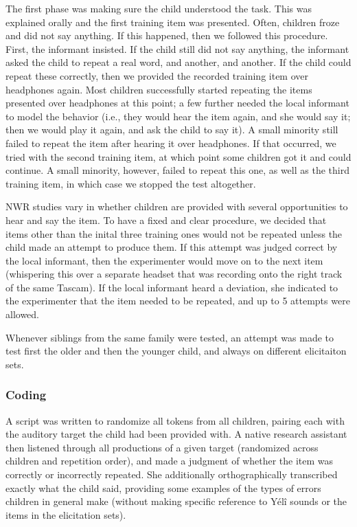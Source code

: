 \documentclass[english,,man,floatsintext]{apa6}
\begin{document}
The first phase was making sure the child understood the task. This was explained orally and the first training item was presented. Often, children froze and did not say anything. If this happened, then we followed this procedure. First, the informant insisted. If the child still did not say anything, the informant asked the child to repeat a real word, and another, and another. If the child could repeat these correctly, then we provided the recorded training item over headphones again. Most children successfully started repeating the items presented over headphones at this point; a few further needed the local informant to model the behavior (i.e., they would hear the item again, and she would say it; then we would play it again, and ask the child to say it). A small minority still failed to repeat the item after hearing it over headphones. If that occurred, we tried with the second training item, at which point some children got it and could continue. A small minority, however, failed to repeat this one, as well as the third training item, in which case we stopped the test altogether.

NWR studies vary in whether children are provided with several opportunities to hear and say the item. To have a fixed and clear procedure, we decided that items other than the inital three training ones would not be repeated unless the child made an attempt to produce them. If this attempt was judged correct by the local informant, then the experimenter would move on to the next item (whispering this over a separate headset that was recording onto the right track of the same Tascam). If the local informant heard a deviation, she indicated to the experimenter that the item needed to be repeated, and up to 5 attempts were allowed.

Whenever siblings from the same family were tested, an attempt was made to test first the older and then the younger child, and always on different elicitaiton sets.

\hypertarget{coding}{%
\subsubsection{Coding}\label{coding}}

A script was written to randomize all tokens from all children, pairing each with the auditory target the child had been provided with. A native research assistant then listened through all productions of a given target (randomized across children and repetition order), and made a judgment of whether the item was correctly or incorrectly repeated. She additionally orthographically transcribed exactly what the child said, providing some examples of the types of errors children in general make (without making specific reference to Yélî sounds or the items in the elicitation sets).
\end{document}
